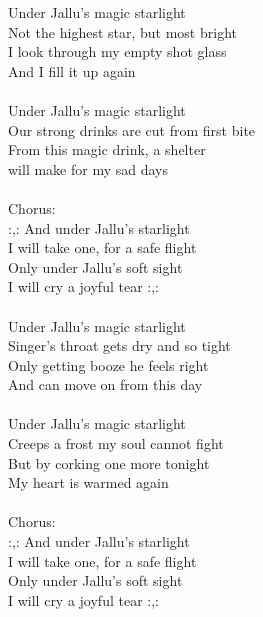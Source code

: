 
            Under Jallu's magic starlight  \\
            Not the highest star, but most bright \\
            I look through my empty shot glass \\
            And I fill it up again \\
\hspace{10mm} \\
            Under Jallu's magic starlight \\
            Our strong drinks are cut from first bite  \\
            From this magic drink, a shelter  \\
            will make for my sad days \\
\hspace{10mm} \\
            Chorus: \\
            :,: And under Jallu's starlight \\
            I will take one, for a safe flight \\
            Only under Jallu's soft sight  \\
            I will cry a joyful tear :,: \\
\hspace{10mm} \\
            Under Jallu's magic starlight  \\
            Singer's throat gets dry and so tight  \\
            Only getting booze he feels right \\
            And can move on from this day \\
\hspace{10mm} \\
            Under Jallu's magic starlight  \\
            Creeps a frost my soul cannot fight  \\
            But by corking one more tonight  \\
            My heart is warmed again \\
\hspace{10mm} \\
            Chorus: \\
            :,: And under Jallu's starlight  \\
            I will take one, for a safe flight  \\
            Only under Jallu's soft sight  \\
            I will cry a joyful tear :,: \\
